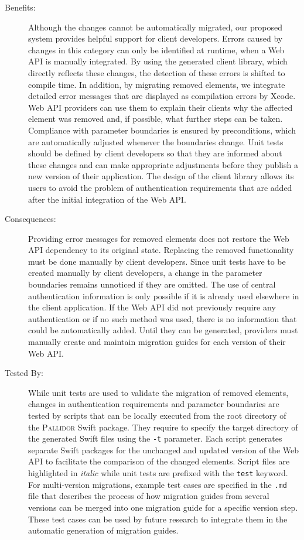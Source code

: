 \begin{description}
	\item[Benefits:] Although the changes cannot be automatically migrated, our proposed system provides helpful support for client developers. Errors caused by changes in this category can only be identified at runtime, when a Web API \newpage is manually integrated. By using the generated client library, which directly reflects these changes, the detection of these errors is shifted to compile time. In addition, by migrating removed elements, we integrate detailed error messages that are displayed as compilation errors by Xcode. Web API providers can use them to explain their clients why the affected element was removed and, if possible, what further steps can be taken. Compliance with parameter boundaries is ensured by preconditions, which are automatically adjusted whenever the boundaries change. Unit tests should be defined by client developers so that they are informed about these changes and can make appropriate adjustments before they publish a new version of their application. The design of the client library allows its users to avoid the problem of authentication requirements that are added after the initial integration of the Web API. 
	\item[Consequences:] Providing error messages for removed elements does not restore the Web API dependency to its original state. Replacing the removed functionality must be done manually by client developers. Since unit tests have to be created manually by client developers, a change in the parameter boundaries remains unnoticed if they are omitted. The use of central authentication information is only possible if it is already used elsewhere in the client application. If the Web API did not previously require any authentication or if no such method was used, there is no information that could be automatically added. Until they can be generated, providers must manually create and maintain migration guides for each version of their Web API.
	\item[Tested By:] While unit tests are used to validate the migration of removed elements, changes in authentication requirements and parameter boundaries are tested by scripts that can be locally executed from the root directory of the \textsc{Pallidor} Swift package. They require to specify the target directory of the generated Swift files using the \texttt{-t} parameter. Each script generates separate Swift packages for the unchanged and updated version of the Web API to facilitate the comparison of the changed elements. Script files are highlighted in \textit{italic} while unit tests are prefixed with the \texttt{test} keyword. For multi-version migrations, example test cases are specified in the \texttt{.md} file that describes the process of how migration guides from several versions can be merged into one migration guide for a specific version step. These test cases can be used by future research to integrate them in the automatic generation of migration guides.
\end{description}
